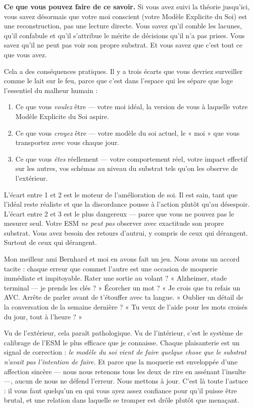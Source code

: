 \documentclass[11pt, twoside, openright]{book}
\begin{document}
\textbf{Ce que vous pouvez faire de ce savoir.} Si vous avez suivi la théorie jusqu'ici, vous savez désormais que votre moi conscient (votre Modèle Explicite du Soi) est une reconstruction, pas une lecture directe. Vous savez qu'il comble les lacunes, qu'il confabule et qu'il s'attribue le mérite de décisions qu'il n'a pas prises. Vous savez qu'il ne peut pas voir son propre substrat. Et vous savez que c'est tout ce que vous avez.

Cela a des conséquences pratiques. Il y a trois écarts que vous devriez surveiller comme le lait sur le feu, parce que c'est dans l'espace qui les sépare que loge l'essentiel du malheur humain :

\begin{enumerate}
  \item Ce que vous \textit{voulez} être --- votre moi idéal, la version de vous à laquelle votre Modèle Explicite du Soi aspire.
  \item Ce que vous \textit{croyez} être --- votre modèle du soi actuel, le « moi » que vous transportez avec vous chaque jour.
  \item Ce que vous \textit{êtes} réellement --- votre comportement réel, votre impact effectif sur les autres, vos schémas au niveau du substrat tels qu'on les observe de l'extérieur.
\end{enumerate}

L'écart entre 1 et 2 est le moteur de l'amélioration de soi. Il est sain, tant que l'idéal reste réaliste et que la discordance pousse à l'action plutôt qu'au désespoir. L'écart entre 2 et 3 est le plus dangereux --- parce que vous ne pouvez pas le mesurer seul. Votre ESM \textit{ne peut pas} observer avec exactitude son propre substrat. Vous avez besoin des retours d'autrui, y compris de ceux qui dérangent. Surtout de ceux qui dérangent.

Mon meilleur ami Bernhard et moi en avons fait un jeu. Nous avons un accord tacite : chaque erreur que commet l'autre est une occasion de moquerie immédiate et impitoyable. Rater une sortie au volant ? « Alzheimer, stade terminal --- je prends les clés ? » Écorcher un mot ? « Je crois que tu refais un AVC. Arrête de parler avant de t'étouffer avec ta langue. » Oublier un détail de la conversation de la semaine dernière ? « Tu veux de l'aide pour les mots croisés du jour, tout à l'heure ? »

Vu de l'extérieur, cela paraît pathologique. Vu de l'intérieur, c'est le système de calibrage de l'ESM le plus efficace que je connaisse. Chaque plaisanterie est un signal de correction : \textit{le modèle du soi vient de faire quelque chose que le substrat n'avait pas l'intention de faire.} Et parce que la moquerie est enveloppée d'une affection sincère --- nous nous retenons tous les deux de rire en assénant l'insulte ---, aucun de nous ne défend l'erreur. Nous mettons à jour. C'est là toute l'astuce : il vous faut quelqu'un en qui vous ayez assez confiance pour qu'il puisse être brutal, et une relation dans laquelle se tromper est drôle plutôt que menaçant.
\end{document}
